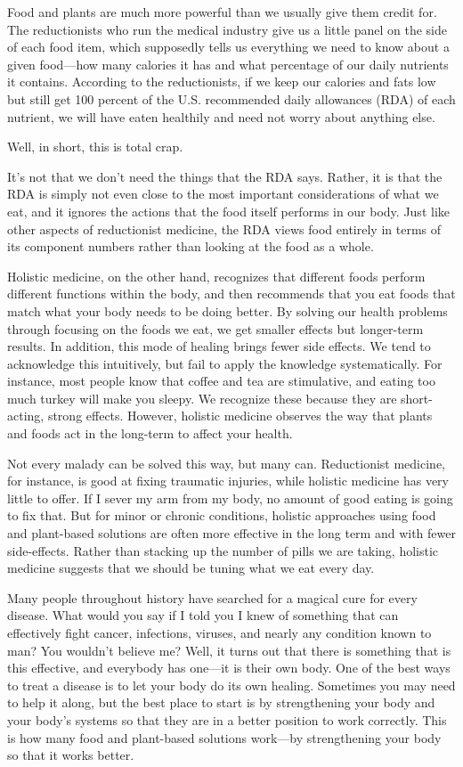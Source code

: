 Food and plants are much more powerful than we usually give them credit
for. The reductionists who run the medical industry give us a little
panel on the side of each food item, which supposedly tells us
everything we need to know about a given food—how many calories it has
and what percentage of our daily nutrients it contains. According to
the reductionists, if we keep our calories and fats low but still get
100 percent of the U.S. recommended daily allowances (RDA) of each
nutrient, we will have eaten healthily and need not worry about
anything else.

Well, in short, this is total crap.

It's not that we don't need the things
that the RDA says. Rather, it is that the RDA is simply not even close
to the most important considerations of what we eat, and it ignores the
actions that the food itself performs in our body. Just like other
aspects of reductionist medicine, the RDA views food entirely in terms
of its component numbers rather than looking at the food as a whole. 

Holistic medicine, on the other hand, recognizes that different foods
perform different functions within the body, and then recommends that
you eat foods that match what your body needs to be doing better. By
solving our health problems
through focusing on
the foods we eat, we get smaller effects but longer-term results. In
addition, this mode of healing brings fewer side effects.  We tend to
acknowledge this intuitively, but fail to apply the knowledge
systematically.  For instance, most people know that coffee and tea are
stimulative, and eating too much turkey will make you sleepy.  We
recognize these because they are short-acting, strong effects. 
However, holistic medicine observes the way that plants and foods act
in the long-term to affect your health.

Not every malady can be solved this way, but many can. Reductionist
medicine, for instance, is good at fixing traumatic injuries, while
holistic medicine has very little to offer. If I sever my arm from my
body, no amount of good eating is going to fix that. But for minor or
chronic conditions, holistic approaches using food and plant-based
solutions are often more effective in the long term
and with fewer
side-effects.  Rather than stacking up the number of pills we are
taking, holistic medicine suggests that we should be tuning what we eat
every day.

Many people throughout history have searched for a magical cure for
every disease. What would you say if I told you I knew of something
that can effectively
fight cancer, infections, viruses, and nearly any condition
known to man?  You
wouldn't believe me?  Well, it turns out that there is
something that is this effective, and everybody has one—it is their own
body. One of the best
ways to treat a
disease is to let
your body do its own healing. Sometimes you may need to help it along,
but the best place to start is by strengthening your body and your
body's systems so that they are in a better position
to work correctly. This is how many food and plant-based solutions
work—by strengthening your body so that it works better.


